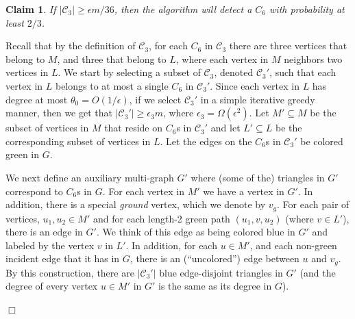 \documentclass{article}
\newcommand{\eps}{\epsilon}
\newcommand{\calC}{{\mathcal{C}}}
\newenvironment{proof}{\smallskip\noindent{\bf Proof:}}%
        {\hspace*{\fill}$\Box$\par}
\newtheorem{claim}[lemma]{Claim}
\newcommand{\commentt}[1]{ {}}
\begin{document}
\begin{claim}\label{clm:C6-3}
If $|\calC_3| \geq \eps m/36$, then the algorithm will detect a $C_6$ with probability at least $2/3$.
\end{claim}



\begin{proof}
Recall that by the definition of $\calC_3$, for each $C_6$ in $\calC_3$ there are three vertices that belong to $M$, and three that belong to $L$, where each vertex in $M$ neighbors two vertices in $L$.
We start by selecting a subset of $\calC_3$, denoted $\calC_3'$, such that each vertex in $L$ belongs to at most a single $C_6$ in $\calC_3'$. Since each vertex in $L$ has degree at most  $\theta_0 = O(1/\eps)$, if we select $\calC_3'$ in a simple iterative greedy manner, then we get that
$|\calC_3'| \geq \eps_3 m$, where $\eps_3 = \Omega(\eps^2)$. Let $M'\subseteq M$ be the subset of vertices in $M$ that reside on $C_6$s in $\calC_3'$ and let $L'\subseteq L$ be the corresponding subset of vertices in  $L$. Let the edges on the
$C_6$s in $\calC_3'$ be colored green in $G$.

We next define an auxiliary multi-graph $G'$ 
    where (some of the) triangles in $G'$ correspond to $C_6$s in $G$. 
%
For each vertex in $M'$  we have a vertex in $G'$. In addition, there is a special \emph{ground} vertex, which we denote by $v_g$. For each pair of vertices, $u_1,u_2\in M'$ and for each length-2 green path $(u_1,v,u_2)$ (where $v\in L'$), there is an edge in $G'$. We think of this edge as being colored blue in $G'$ and labeled by the vertex $v$ in $L'$.
In addition, for each  $u\in M'$, and each non-green incident edge that it has in $G$, there is an (``uncolored'') edge between $u$ and $v_g$.
By this construction, there are $|\calC_3'|$ blue edge-disjoint triangles in $G'$ (and the degree of every vertex $u\in M'$ in $G'$ is the same as its degree in $G$).


\end{proof}
\end{document}
